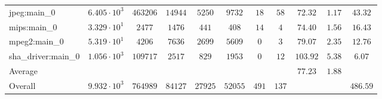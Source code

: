 \begin{tabular}{|l|c|c|c|c|c|c|c|c|c|c|}
jpeg:main\_0            & $ 6.405 \cdot 10^{3} $ & $ 463206 $ & $ 14944 $ & $ 5250  $ & $ 9732  $ & $ 18  $ & $ 58  $ & $ 72.32       $ & $ 1.17    $ & $ 43.32   $ \\
mips:main\_0            & $ 3.329 \cdot 10^{1} $ & $ 2477   $ & $ 1476  $ & $ 441   $ & $ 408   $ & $ 14  $ & $ 4   $ & $ 74.40       $ & $ 1.56    $ & $ 16.43   $ \\
mpeg2:main\_0           & $ 5.319 \cdot 10^{1} $ & $ 4206   $ & $ 7636  $ & $ 2699  $ & $ 5609  $ & $ 0   $ & $ 3   $ & $ 79.07       $ & $ 2.35    $ & $ 12.76   $ \\
sha\_driver:main\_0     & $ 1.056 \cdot 10^{3} $ & $ 109717 $ & $ 2517  $ & $ 829   $ & $ 1953  $ & $ 0   $ & $ 12  $ & $ 103.92      $ & $ 5.38    $ & $ 6.07    $ \\
\hline
Average                 & $                    $ & $        $ & $       $ & $       $ & $       $ & $     $ & $     $ & $ 77.23       $ & $ 1.88    $ & $         $ \\
\hline
Overall                 & $ 9.932 \cdot 10^{3} $ & $ 764989 $ & $ 84127 $ & $ 27925 $ & $ 52055 $ & $ 491 $ & $ 137 $ & $             $ & $         $ & $ 486.59  $ \\
\hline
\end{tabular}
